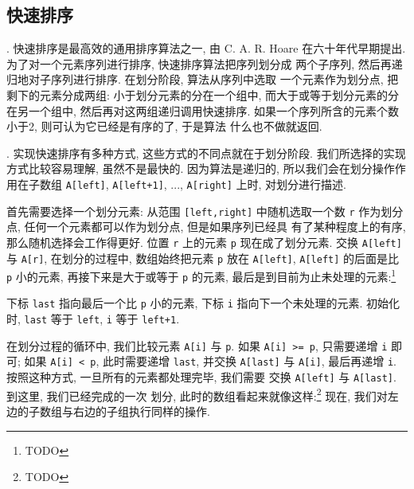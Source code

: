 \subsection{快速排序}
\label{subsec:quicksort}

. 快速排序是最高效的通用排序算法之一, 由 C. A. R. Hoare
在六十年代早期提出. 为了对一个元素序列进行排序, 快速排序算法把序列划分成
两个子序列, 然后再递归地对子序列进行排序. 在划分阶段, 算法从序列中选取
一个元素作为划分点, 把剩下的元素分成两组: 小于划分元素的分在一个组中, 
而大于或等于划分元素的分在另一个组中, 然后再对这两组递归调用快速排序.
如果一个序列所含的元素个数小于2, 则可认为它已经是有序的了, 于是算法
什么也不做就返回.

. 实现快速排序有多种方式, 这些方式的不同点就在于划分阶段.
我们所选择的实现方式比较容易理解, 虽然不是最快的. 因为算法是递归的,
所以我们会在划分操作作用在子数组 \texttt{A[left]}, \texttt{A[left+1]},
..., \texttt{A[right]} 上时, 对划分进行描述.

首先需要选择一个划分元素: 从范围 \texttt{[left,right]} 中随机选取一个数
\texttt{r} 作为划分点, 任何一个元素都可以作为划分点, 但是如果序列已经具
有了某种程度上的有序, 那么随机选择会工作得更好. 位置 \texttt{r} 上的元素
\texttt{p} 现在成了划分元素. 交换 \texttt{A[left]} 与 \texttt{A[r]},
在划分的过程中, 数组始终把元素 \texttt{p} 放在 \texttt{A[left]}, 
\texttt{A[left]} 的后面是比 \texttt{p} 小的元素, 再接下来是大于或等于
\texttt{p} 的元素, 最后是到目前为止未处理的元素:\footnote{TODO}

下标 \texttt{last} 指向最后一个比 \texttt{p} 小的元素, 下标 \texttt{i}
指向下一个未处理的元素. 初始化时, \texttt{last} 等于 \texttt{left},
\texttt{i} 等于 \texttt{left+1}.

在划分过程的循环中, 我们比较元素 \texttt{A[i]} 与 \texttt{p}. 如果 
\texttt{A[i] >= p}, 只需要递增 \texttt{i} 即可; 如果 \texttt{A[i] < p},
此时需要递增 \texttt{last}, 并交换 \texttt{A[last]} 与 \texttt{A[i]},
最后再递增 \texttt{i}. 按照这种方式, 一旦所有的元素都处理完毕, 我们需要
交换 \texttt{A[left]} 与 \texttt{A[last]}. 到这里, 我们已经完成的一次
划分, 此时的数组看起来就像这样:\footnote{TODO}
现在, 我们对左边的子数组与右边的子组执行同样的操作.

